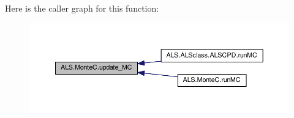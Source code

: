 Here is the caller graph for this function\+:
\nopagebreak
\begin{figure}[H]
\begin{center}
\leavevmode
\includegraphics[width=350pt]{namespace_a_l_s_1_1_monte_c_afed4abf0b95b57b2c76360c0b8c9f6d5_icgraph}
\end{center}
\end{figure}


